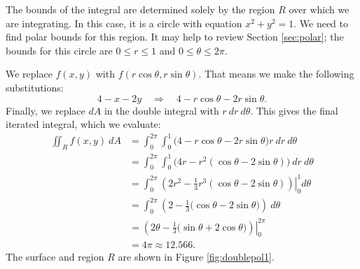 {The bounds of the integral are determined solely by the region $R$ over which we are integrating. In this case, it is a circle with equation $x^2+y^2=1$. We need to find polar bounds for this region. It may help to review Section \ref{sec:polar}; the bounds for this circle are $0\leq r\leq 1$ and $0\leq \theta\leq 2\pi$.

We replace $f(x,y)$ with $f(r\cos\theta,r\sin\theta)$. That means we make the following substitutions:
$$4-x-2y \quad \Rightarrow \quad 4-r\cos\theta-2r\sin\theta.$$
Finally, we replace $dA$ in the double integral with $r\ dr\ d\theta$. This gives the final iterated integral, which we evaluate:
\begin{align*}
\iint_Rf(x,y)\ dA &= \int_0^{2\pi}\int_0^1\big(4-r\cos\theta-2r\sin\theta\big)r\ dr\ d\theta\\
						&= \int_0^{2\pi}\int_0^1\big(4r-r^2(\cos\theta-2\sin\theta)\big)\ dr\ d\theta\\
						&= \int_0^{2\pi}\left.\left(2r^2-\frac13r^3(\cos\theta-2\sin\theta)\right)\right|_0^1d\theta\\
						&= \int_0^{2\pi} \left(2-\frac13\big(\cos\theta-2\sin\theta\big)\right)\ d\theta\\
						&= \left.\left(2\theta -\frac13\big(\sin\theta+2\cos\theta\big)\right)\right|_0^{2\pi} \\
						&= 4\pi \approx 12.566.
\end{align*}
The surface and region $R$ are shown in Figure \ref{fig:doublepol1}.
}\\

